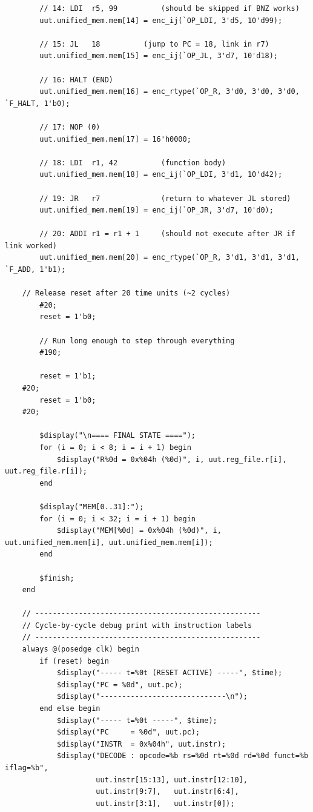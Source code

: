 \documentclass[12pt]{report}
\begin{document}
\begin{lstlisting}
        // 14: LDI  r5, 99          (should be skipped if BNZ works)
        uut.unified_mem.mem[14] = enc_ij(`OP_LDI, 3'd5, 10'd99);

        // 15: JL   18          (jump to PC = 18, link in r7)
        uut.unified_mem.mem[15] = enc_ij(`OP_JL, 3'd7, 10'd18);

        // 16: HALT (END)
        uut.unified_mem.mem[16] = enc_rtype(`OP_R, 3'd0, 3'd0, 3'd0, `F_HALT, 1'b0);

        // 17: NOP (0)
        uut.unified_mem.mem[17] = 16'h0000;

        // 18: LDI  r1, 42          (function body)
        uut.unified_mem.mem[18] = enc_ij(`OP_LDI, 3'd1, 10'd42);

        // 19: JR   r7              (return to whatever JL stored)
        uut.unified_mem.mem[19] = enc_ij(`OP_JR, 3'd7, 10'd0);

        // 20: ADDI r1 = r1 + 1     (should not execute after JR if link worked)
        uut.unified_mem.mem[20] = enc_rtype(`OP_R, 3'd1, 3'd1, 3'd1, `F_ADD, 1'b1);
        
	// Release reset after 20 time units (~2 cycles)
        #20;
        reset = 1'b0;

        // Run long enough to step through everything
        #190;

        reset = 1'b1;
	#20;
        reset = 1'b0;
	#20;

        $display("\n==== FINAL STATE ====");
        for (i = 0; i < 8; i = i + 1) begin
            $display("R%0d = 0x%04h (%0d)", i, uut.reg_file.r[i], uut.reg_file.r[i]);
        end

        $display("MEM[0..31]:");
        for (i = 0; i < 32; i = i + 1) begin
            $display("MEM[%0d] = 0x%04h (%0d)", i, uut.unified_mem.mem[i], uut.unified_mem.mem[i]);
        end

        $finish;
    end

    // ----------------------------------------------------
    // Cycle-by-cycle debug print with instruction labels
    // ----------------------------------------------------
    always @(posedge clk) begin
        if (reset) begin
            $display("----- t=%0t (RESET ACTIVE) -----", $time);
            $display("PC = %0d", uut.pc);
            $display("-----------------------------\n");
        end else begin
            $display("----- t=%0t -----", $time);
            $display("PC     = %0d", uut.pc);
            $display("INSTR  = 0x%04h", uut.instr);
            $display("DECODE : opcode=%b rs=%0d rt=%0d rd=%0d funct=%b iflag=%b",
                     uut.instr[15:13], uut.instr[12:10],
                     uut.instr[9:7],   uut.instr[6:4],
                     uut.instr[3:1],   uut.instr[0]);


\end{lstlisting}
\end{document}

